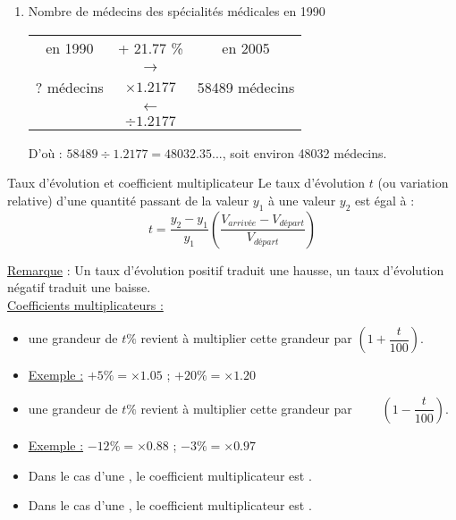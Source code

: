 \documentclass[12pt,a4paper]{article}
\begin{document}
\begin{enumerate}[label=\arabic*)]
	D'où : $\num{58489} \times \num{0.931} = \num{54453.259}$, soit environ \num{54453} médecins.
	
	\newpage
	
	\item Nombre de médecins des spécialités médicales en 1990 
	
	\begin{table}[h!]
		\centering
		\begin{tabular}{|ccc|}
			\hline
			en \num{1990} & + \num{21.77} \%  & en \num{2005} \\
			& {\LARGE $\rightarrow$} &			\\
			? médecins& $\times \num{1.2177}$ & \num{58489} médecins \\
			\hline
			& {\LARGE $\leftarrow$} & \\
			& $\div \num{1.2177}$ & \\
			\hline
		\end{tabular}
	\end{table}
	
	D'où : $\num{58489} \div \num{1.2177} = \num{48032.35}...$, soit environ \num{48032} médecins.
\end{enumerate}

\begin{mybilan2}{Taux d'évolution et coefficient multiplicateur}
	Le taux d'évolution $t$ (ou variation relative) d'une quantité passant de la valeur $y_1$ à une valeur $y_2$ est égal à :
	\begin{equation*}
	t = \dfrac{y_2 - y_1}{y_1} \left(\dfrac{V_{arrivée} - V_{départ}}{V_{départ}}\right)
	\end{equation*}
	
	\underline{Remarque} : Un taux d'évolution positif traduit une hausse, un taux d'évolution négatif traduit une baisse.\\
	
	\underline{Coefficients multiplicateurs :} 
	\begin{itemize}
		\item {} une grandeur de $t \%$ revient à multiplier cette grandeur par $(1 + \dfrac{t}{100})$.
		
		\item \underline{Exemple :} $+ 5 \% = \times \num{1.05}$ ; $+ 20 \% = \times \num{1.20}$ \\
		
		\item {} une grandeur de $t \%$ revient à multiplier cette grandeur par $\qquad (1 - \dfrac{t}{100})$.
		\item \underline{Exemple :} $- 12 \% = \times \num{0.88}$ ; $- 3 \% = \times \num{0.97}$ \\
		
		\item Dans le cas d'une , le coefficient multiplicateur est .
		
		\item Dans le cas d'une , le coefficient multiplicateur est .
	\end{itemize}	
	
\end{mybilan2}
\end{document}

